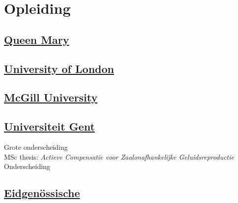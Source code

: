 \documentclass[a4paper]{deedy-resume} %
\begin{document}
\begin{minipage}[t]{0.34\textwidth} %


\section{Opleiding} 

\subsection{\href{http://www.qmul.ac.uk}{Queen Mary}}
\subsection{\href{http://www.qmul.ac.uk}{University of London}}
\sectionspace %


\subsection{\href{http://www.mcgill.ca}{McGill University}}
\sectionspace %

\subsection{\href{https://www.ugent.be}{Universiteit Gent}}
Grote onderscheiding\\
MSc thesis: \textit{Actieve Compensatie voor Zaalonafhankelijke Geluidsreproductie} \\

Onderscheiding\\
\sectionspace %

\subsection{\href{http://www.ethz.ch/}{Eidgen\"{o}ssische }}

\end{minipage}
\end{document}
